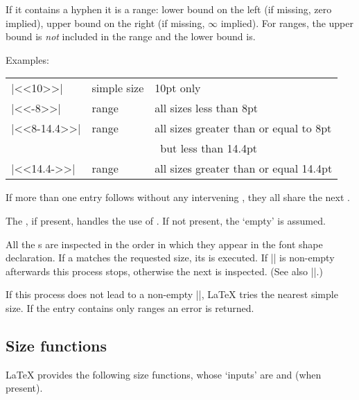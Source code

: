 \documentclass{ltxguide}[1995/11/28]
\begin{document}
If it contains a hyphen it is a range: lower bound on the left (if
missing, zero implied), upper bound on the right (if missing, $\infty$
implied). For ranges, the upper bound is \emph{not} included in the
range and the lower bound is.

Examples:
\begin{center}
  \begin{tabular}{lll}
    |<<10>>|     & simple size & 10pt only \\
    |<<-8>>|     & range       & all sizes less than 8pt \\
    |<<8-14.4>>| & range       & all sizes greater than or equal to 8pt \\
                 &             & \ but less than 14.4pt \\
    |<<14.4->>|  & range       & all sizes greater than or equal 14.4pt
\end{tabular}
\end{center}
If more than one  entry follows without any intervening
, they all share the next .

The , if present, handles the use of .  If
not present, the `empty'  is assumed.

All the s are inspected in the order in which they appear
in the font shape declaration. If a  matches the requested
size, its  is executed. If |\external@font| is
non-empty afterwards this process stops, otherwise the next
 is inspected. (See also |\DeclareSizeFunction|.)

If this process does not lead to a non-empty |\external@font|, \LaTeX{}
tries the nearest simple size. If the entry contains only ranges an
error is returned.

\subsection{Size functions}
\label{sec:sizefunct}

\LaTeX{} provides the following size functions, whose `inputs' are
 and  (when present).
\end{document}
